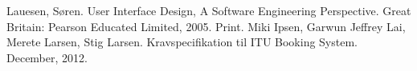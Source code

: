 \begin{thebibliography}{9}
 Lauesen, Søren. User Interface Design, A Software Engineering Perspective. Great Britain: Pearson Educated Limited, 2005.  Print.
 Miki Ipsen, Garwun Jeffrey Lai, Merete Larsen, Stig Larsen. Kravspecifikation til ITU Booking System. December, 2012.
\end{thebibliography}
\label{A_BIB}